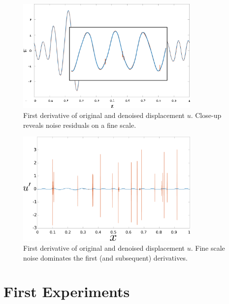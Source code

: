 \begin{frame}
 \begin{figure}
\includegraphics[width=0.8\textwidth]{Images/littleSpikesClose.pdf}
\caption{First derivative of original and denoised displacement $u$. Close-up reveals noise residuals on a fine scale.}
\centering\end{figure}
\end{frame}

\begin{frame}
 \begin{figure}
\includegraphics[width=0.8\textwidth]{Images/derivative.pdf}
\caption{First derivative of original and denoised displacement $u$. Fine scale noise dominates the first (and subsequent) derivatives.}
\centering\end{figure}
\end{frame}


\section{First Experiments}



